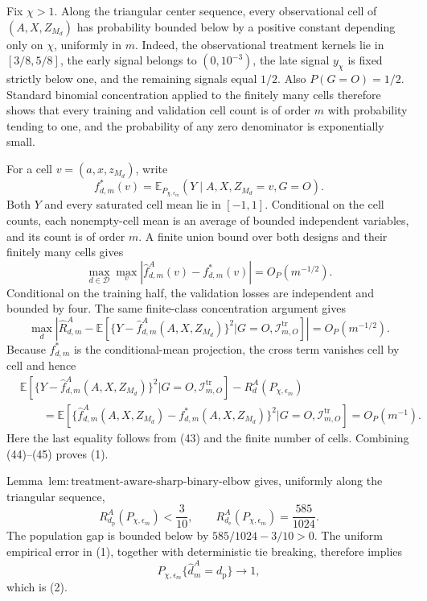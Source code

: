 Fix \(\chi>1\). Along the triangular center sequence, every observational cell of \((A,X,Z_{M_d})\) has probability bounded below by a positive constant depending only on \(\chi\), uniformly in \(m\). Indeed, the observational treatment kernels lie in \([3/8,5/8]\), the early signal belongs to \((0,10^{-3})\), the late signal \(y_\chi\) is fixed strictly below one, and the remaining signals equal \(1/2\). Also \(P(G=O)=1/2\). Standard binomial concentration applied to the finitely many cells therefore shows that every training and validation cell count is of order \(m\) with probability tending to one, and the probability of any zero denominator is exponentially small.

For a cell \(v=(a,x,z_{M_d})\), write
\[
 f_{d,m}^*(v)=\mathbb E_{P_{\chi,\epsilon_m}}(Y\mid A,X,Z_{M_d}=v,G=O).
\]
Both \(Y\) and every saturated cell mean lie in \([-1,1]\). Conditional on the cell counts, each nonempty-cell mean is an average of bounded independent variables, and its count is of order \(m\). A finite union bound over both designs and their finitely many cells gives
\[
 \max_{d\in\mathcal D}\max_v
 |\widehat f_{d,m}^A(v)-f_{d,m}^*(v)|=O_P(m^{-1/2}).        \tag{43}
\]
Conditional on the training half, the validation losses are independent and bounded by four. The same finite-class concentration argument gives
\[
 \max_d\left|\widehat R_{d,m}^A-
 \mathbb E\left[
 \{Y-\widehat f_{d,m}^A(A,X,Z_{M_d})\}^2
 \mathrel{\Big|}G=O,\mathcal I_{m,O}^{\mathrm{tr}}
 \right]\right|=O_P(m^{-1/2}).                            \tag{44}
\]
Because \(f_{d,m}^*\) is the conditional-mean projection, the cross term vanishes cell by cell and hence
\[
\begin{aligned}
 &\mathbb E\left[
 \{Y-\widehat f_{d,m}^A(A,X,Z_{M_d})\}^2
 \mathrel{\Big|}G=O,\mathcal I_{m,O}^{\mathrm{tr}}
 \right]-R_d^A(P_{\chi,\epsilon_m})\\
 &\qquad=
 \mathbb E\left[
 \{\widehat f_{d,m}^A(A,X,Z_{M_d})-f_{d,m}^*(A,X,Z_{M_d})\}^2
 \mathrel{\Big|}G=O,\mathcal I_{m,O}^{\mathrm{tr}}
 \right]
 =O_P(m^{-1}).                                             \tag{45}
\end{aligned}
\]
Here the last equality follows from (43) and the finite number of cells. Combining (44)--(45) proves (1).

Lemma~\(\mathrm{lem{:}treatment\text{-}aware\text{-}sharp\text{-}binary\text{-}elbow}\) gives, uniformly along the triangular sequence,
\[
 R_{d_{\mathrm p}}^A(P_{\chi,\epsilon_m})<\frac{3}{10},
 \qquad
 R_{d_{\mathrm e}}^A(P_{\chi,\epsilon_m})=\frac{585}{1024}.
\]
The population gap is bounded below by \(585/1024-3/10>0\). The uniform empirical error in (1), together with deterministic tie breaking, therefore implies
\[
 P_{\chi,\epsilon_m}\{\widehat d_m^A=d_{\mathrm p}\}\longrightarrow1,
\]
which is (2).

